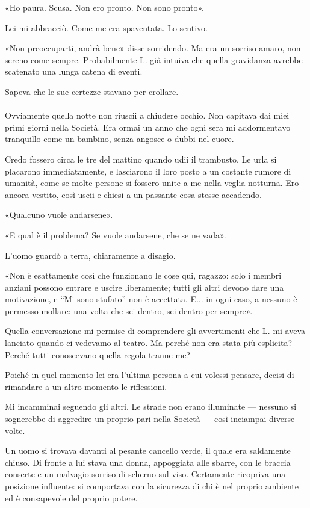 \documentclass[a4paper,12pt]{book}
\begin{document}
«Ho paura. Scusa. Non ero pronto. Non sono pronto».

Lei mi abbracciò. Come me era spaventata. Lo sentivo.

«Non preoccuparti, andrà bene» disse sorridendo. Ma era un sorriso amaro, non
sereno come sempre. Probabilmente L. già intuiva che quella gravidanza avrebbe
scatenato una lunga catena di eventi.

Sapeva che le sue certezze stavano per crollare.

\paragraph{}
Ovviamente quella notte non riuscii a chiudere occhio. Non capitava dai miei
primi giorni nella Società. Era ormai un anno che ogni sera mi addormentavo
tranquillo come un bambino, senza angosce o dubbi nel cuore.

Credo fossero circa le tre del mattino quando udii il trambusto. Le urla si
placarono immediatamente, e lasciarono il loro posto a un costante rumore di
umanità, come se molte persone si fossero unite a me nella veglia notturna. Ero
ancora vestito, così uscii e chiesi a un passante cosa stesse accadendo.

«Qualcuno vuole andarsene».

«E qual è il problema? Se vuole andarsene, che se ne vada».

L'uomo guardò a terra, chiaramente a disagio.

«Non è esattamente così che funzionano le cose qui, ragazzo: solo i membri
anziani possono entrare e uscire liberamente; tutti gli altri devono dare una
motivazione, e ``Mi sono stufato'' non è accettata. E... in ogni caso, a nessuno
è permesso mollare: una volta che sei dentro, sei dentro per sempre».

Quella conversazione mi permise di comprendere gli avvertimenti che L. mi
aveva lanciato quando ci vedevamo al teatro. Ma perché non era stata più
esplicita? Perché tutti conoscevano quella regola tranne me?

Poiché in quel momento lei era l'ultima persona a cui volessi pensare, decisi di
rimandare a un altro momento le riflessioni.

Mi incamminai seguendo gli altri. Le strade non erano illuminate --- nessuno si
sognerebbe di aggredire un proprio pari nella Società --- così inciampai diverse
volte.

Un uomo si trovava davanti al pesante cancello verde, il quale era saldamente
chiuso. Di fronte a lui stava una donna, appoggiata alle sbarre, con le braccia
conserte e un malvagio sorriso di scherno sul viso. Certamente ricopriva una
posizione influente: si comportava con la sicurezza di chi è nel proprio ambiente
ed è consapevole del proprio potere.
\end{document}

